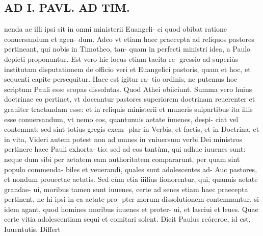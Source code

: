 \documentclass{article}
\begin{document}
\begin{pages}
\section*{AD I. PAVL. AD TIM. }
\marginpar{[ p.228 ]}\pstart nenda ac illi ipsi sit in omni ministerii Euangeli- ci quod obibat ratione conuersandum et agen- dum. Adeo vt etiam haec praecepta ad reliquos pastores pertineant, qui nobis in Timotheo, tan- quam in perfecti ministri idea, a Paulo depicti proponuntur. Est vero hic locus etiam tacita re- gressio ad superiùs institutam disputationem de officio veri et Euangelici pastoris, quam et hoc, et sequenti capite persequitur. Haec est igitur ra- tio ordinis, ne putemus hoc scriptum Pauli esse scopas dissolutas. Quod Athei obiiciunt. Summa vero huius doctrinae eo pertinet, vt doceantur pastores superiorem doctrinam reuerenter et grauiter tractandam esse: et in reliquis ministerii et muneris suipartibus ita illis esse conuersandum, vt nemo eos, quantunuis aetate iuuenes, despi- ciat vel contemnat: sed sint totius gregis exem- plar in Verbis, et factis, et in Doctrina, et in vita, Videri autem potest non ad omnes in vniuersum verbi Dei ministros pertinere haec Pauli exhorta- tio: sed ad eos tantùm, qui adhuc iuuenes sunt: neque dum sibi per aetatem eam authoritatem compararunt, per quam sint populo commenda- biles et venerandi, quales sunt adolescentes ad- Auc pastores, et nondum prouectae aetatis. Sed cùm etia iiilius fionorentur, qui, quanuis aetate grandae- ui, moribus tamen sunt iuuenes, certe ad senes etiam haec praecepta pertinent, ne hi ipsi in ea aetate pro- pter morum dissolutionem contemnantur, si idem agant, quod homines moribus iuuenes et proter- ui, et lasciui et leues. Quae certe vitia adolescentiam sequi et comitari solent.  \pend\pstart Dicit Paulus reóreroe, id est, Iuuentutis. Differt  \pend

\end{pages}
\end{document}
